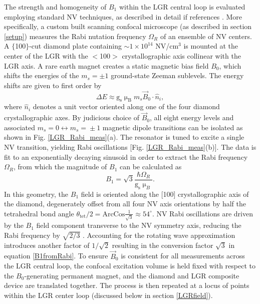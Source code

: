 The strength and homogeneity of $B_1$ within the LGR central loop is evaluated employing standard NV techniques, as described in detail if references \cite{pham2013magnetic,childressthesis2011coherent,mazethesis2010quantum}. More specifically, a custom built scanning confocal microscope (as described in section \ref{setup}) measures the Rabi nutation frequency $\Omega_R$ of an ensemble of NV centers. A $\{$100$\}$-cut diamond plate containing $\sim 1 \times 10^{14}$ NV/cm$^3$ is mounted at the center of the LGR with the $<$100$>$ crystallographic axis collinear with the LGR axis. A rare earth magnet creates a static magnetic bias field $B_0$, which shifts the energies of the $m_s=\pm1$ ground-state Zeeman sublevels. The energy shifts are given to first order by~\cite{taylor2008high}
\begin{equation}
\Delta E \approx \text{g}_{\text{s}} \upmu_\text{B} m_s \vec{B}_0\cdot \hat{n}_i,
\end{equation}
where $\hat{n}_i$ denotes a unit vector oriented along one of the four diamond crystallographic axes. By judicious choice of $\vec{B}_0$, all eight energy levels and associated $m_s\!=\!0\! \leftrightarrow \!m_s\! =\!\pm1$ magnetic dipole transitions can be isolated as shown in Fig. \ref{LGR_Rabi_meas}(a). The resonator is tuned to excite a single NV transition, yielding Rabi oscillations [Fig. \ref{LGR_Rabi_meas}(b)]. The data is fit to an exponentially decaying sinusoid in order to extract the Rabi frequency $\Omega_R$, from which the magnitude of $B_1$ can be calculated as
\begin{equation}\label{B1fromRabi}
B_1 = \sqrt{3}\frac{\hbar \Omega_R}{\text{g}_{\text{s}} \upmu_{B}}.
\end{equation} 
In this geometry, the $B_1$ field is oriented along the [100] crystallographic axis of the diamond, degenerately offset from all four NV axis orientations by half the tetrahedral bond angle $\theta_{\text{tet}}/2 = \text{ArcCos}\frac{1}{\sqrt{3}} \approx 54^\circ$. NV Rabi oscillations are driven by the $B_1$ field component transverse to the NV symmetry axis, reducing the Rabi frequency by $\sqrt{2/3}$ \cite{sasaki2016broadband}. Accounting for the rotating wave approximation introduces another factor of $1/\sqrt{2}$ resulting in the conversion factor $\sqrt{3}$ in equation \ref{B1fromRabi}. To ensure $\vec{B}_0$ is consistent for all measurements across the LGR central loop, the confocal excitation volume is held fixed with respect to the $B_0$-generating permanent magnet, and the diamond and LGR composite device are translated together. The process is then repeated at a locus of points within the LGR center loop (discussed below in section \ref{LGRfield}).

